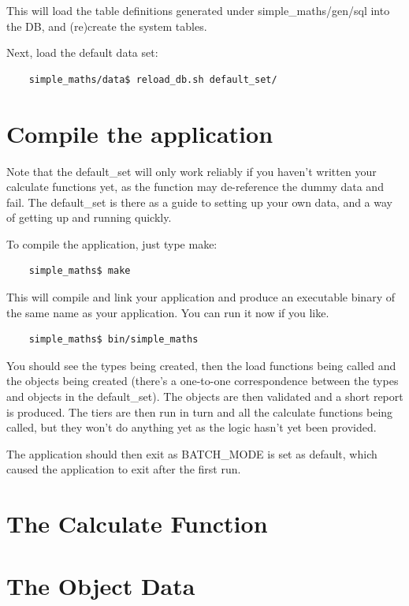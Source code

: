 \documentclass{report}
\begin{document}
This will load the table definitions generated under simple_maths/gen/sql into the DB, and (re)create the 
system tables.

Next, load the default data set:

\begin{verbatim}
    simple_maths/data$ reload_db.sh default_set/
\end{verbatim}

\section{Compile the application}

Note that the default_set will only work reliably if you haven't written your calculate functions yet, as the function may de-reference the dummy data and fail. The default_set is there as a guide to setting up your own data, and a way of getting up and running quickly.

To compile the application, just type make:

\begin{verbatim}
    simple_maths$ make
\end{verbatim}

This will compile and link your application and produce an executable binary of the same name as your 
application. You can run it now if you like. 

\begin{verbatim}
    simple_maths$ bin/simple_maths
\end{verbatim}

You should see the types being created, then the load functions being called and the objects being created (there's a one-to-one correspondence between the types and objects in the default_set). The objects are then validated and a short report is produced. The tiers are then run in turn and all the calculate functions being called, but they won't do anything yet as the logic hasn't yet been provided.

The application should then exit as BATCH_MODE is set as default, which caused the application to exit after the first run.

\section{The Calculate Function}

\section{The Object Data}
\end{document}
